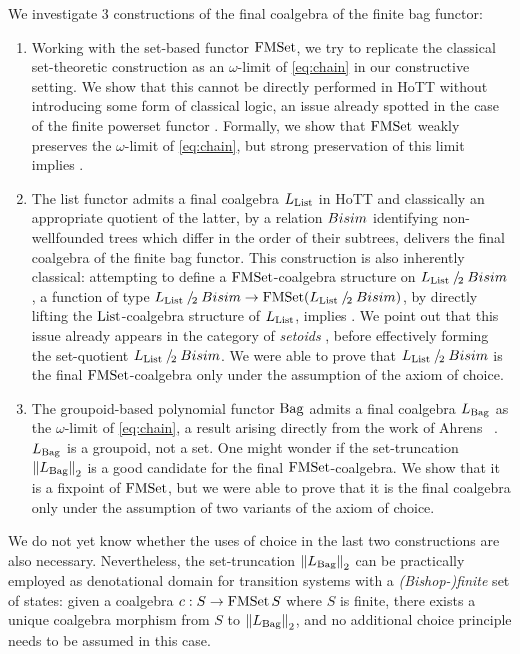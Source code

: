 \documentclass[final,a4paper,USenglish,cleveref]{lipics-v2021}
\begin{document}
We investigate 3 constructions of the final coalgebra of the finite bag functor:
\begin{enumerate}
  \item Working with the set-based functor $\FMSet$, we try to replicate the classical set-theoretic construction as an $\omega$-limit of \eqref{eq:chain} in our constructive setting. We show that this cannot be directly performed in HoTT without introducing some form of classical logic, an issue already spotted in the case of the finite powerset functor \cite{Veltri2021}. Formally, we show that $\FMSet$ weakly preserves the $\omega$-limit of \eqref{eq:chain},
but strong preservation of this limit implies \LLPO{}.
\item The list functor admits a final coalgebra $\Lim{\List}$ in HoTT \cite{Ahrens2015} and classically an appropriate quotient of the latter, by a relation $\Bisim$ identifying non-wellfounded trees which differ in the order of their subtrees, delivers the final coalgebra of the finite bag functor.
  This construction is also inherently classical: attempting to define a $\FMSet$-coalgebra structure on $\Lim{\List} \mathbin{/_{\!2}} \Bisim$, \ie a function of type $\Lim{\List} \mathbin{/_{\!2}} \Bisim \to \FMSet (\Lim{\List} \mathbin{/_{\!2}} \Bisim)$, by directly lifting the $\List$-coalgebra structure of $\Lim{\List}$, implies \LLPO{}. We point out that this issue already appears in the category of \emph{setoids} \cite{Barthe2003}, before effectively forming the set-quotient $\Lim{\List} \mathbin{/_{\!2}} \Bisim$.
  We were able to prove that $\Lim{\List} \mathbin{/_{\!2}} \Bisim$ is the final $\FMSet$-coalgebra only under the assumption of the axiom of choice.
\item The groupoid-based polynomial functor $\Bag$ admits a final coalgebra $\Lim{\Bag}$ as the $\omega$-limit of \eqref{eq:chain}, a result arising directly from the work of Ahrens \etal~\cite{Ahrens2015}. $\Lim{\Bag}$ is a groupoid, not a set. One might wonder if the set-truncation $\SetTrunc{\Lim{\Bag}}$ is a good candidate for the final $\FMSet$-coalgebra. We show that it is a fixpoint of $\FMSet$, but we were able to prove that it is the final coalgebra only under the assumption of two variants of the axiom of choice.
\end{enumerate}
We do not yet know whether the uses of choice in the last two constructions are also necessary. Nevertheless, the set-truncation $\SetTrunc{\Lim{\Bag}}$ can be practically employed as denotational domain for transition systems with a \emph{(Bishop-)finite} set of states: given a coalgebra $c : S \to \FMSet S$ where $S$ is finite, there exists a unique coalgebra morphism from $S$ to $\SetTrunc{\Lim{\Bag}}$, and no additional choice principle needs to be assumed in this case.
\end{document}
